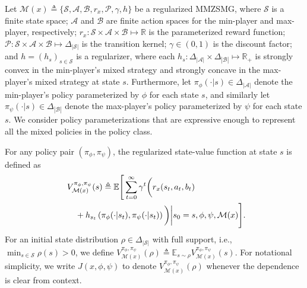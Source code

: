 \documentclass{article}
\theoremstyle{plain}
\theoremstyle{definition}
\theoremstyle{remark}
\def\E{\mathbb E}
\def\R{\mathbb R}
\def\cA{\mathcal A}
\def\cB{\mathcal B}
\def\cM{\mathcal M}
\def\cP{\mathcal P}
\def\cS{\mathcal S}
\def\bydef{\triangleq}
\begin{document}
Let $\cM(x)\!\!\bydef\!\!\{\cS,\cA,\cB,r_x,\cP,\gamma,h\}$ be a regularized MMZSMG, where $\cS$ is a finite state space; $\cA$ and $\cB$ are finite action spaces for the min-player and max-player, respectively; $r_x:\cS\times\cA\times\cB \mapsto \R$ is the parameterized reward function; $\cP:\cS\times\cA\times\cB \mapsto \Delta_{|\cS|}$ is the transition kernel; $\gamma \in (0,1)$ is the discount factor; and $h = (h_s)_{s\in \cS}$ is a regularizer, where each $h_s: \Delta_{|\cA|} \times \Delta_{|\cB|} \mapsto \R_+$ is strongly convex in the min-player's mixed strategy and strongly concave in the max-player's mixed strategy at state $s$. Furthermore, let $\pi_\phi(\cdot| s)\in \Delta_{|\cA|}$ denote the min-player's policy parameterized by $\phi$ for each state $s$, and similarly let $\pi_\psi(\cdot| s)\in \Delta_{|\cB|}$ denote the max-player's policy parameterized by $\psi$ for each state $s$.
We consider policy parameterizations that are expressive enough to represent all the mixed policies in the policy class.

For any policy pair $(\pi_\phi,\pi_\psi)$, the regularized state-value function at state $s$ is defined as
\vspace{-2mm}
\begin{align}
    & V^{\pi_\phi,\pi_\psi}_{\cM(x)}(s)  \bydef \E \Bigg[
        \sum_{t=0}^{\infty}\gamma^t\bigg( r_x(s_t,a_t,b_t) \notag \\
        &\quad +  h_{s_t} \left(\pi_\phi(\cdot|s_t),\pi_\psi(\cdot|s_t) \right) \bigg) \bigg| s_0 = s, \phi,\psi, \cM(x)
    \Bigg].\!\!\! \label{eq: definition-state-value-function-main}
    \vspace{-2mm}
\end{align}
For an initial state distribution $\rho\in\Delta_{|\mathcal S|}$ with full support, i.e., $\min_{s\in\mathcal S}\rho(s)>0$, we define $V^{\pi_\phi,\pi_\psi}_{\cM(x)}(\rho) \bydef \E_{s \sim \rho} V^{\pi_\phi,\pi_\psi}_{\cM(x)}(s)$. For notational simplicity, we write $J(x,\phi,\psi)$ to denote $V^{\pi_\phi,\pi_\psi}_{\cM(x)}(\rho)$ whenever the dependence is clear from context.
\end{document}
